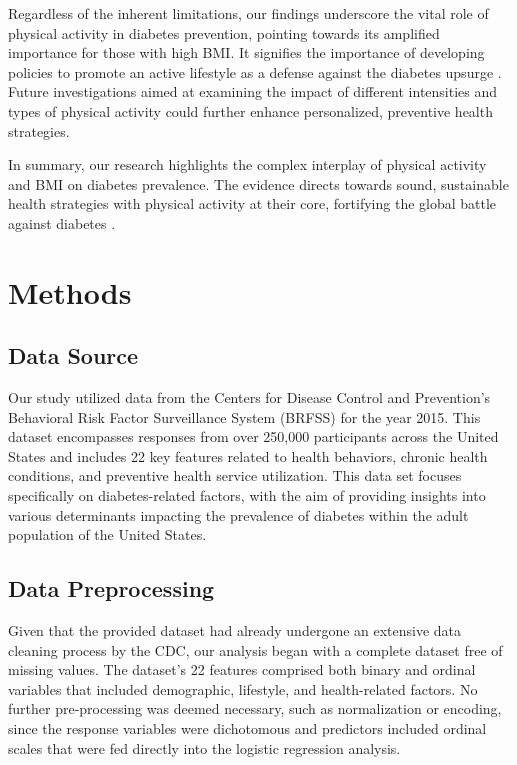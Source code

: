 \documentclass[11pt]{article}
\begin{document}
Regardless of the inherent limitations, our findings underscore the vital role of physical activity in diabetes prevention, pointing towards its amplified importance for those with high BMI. It signifies the importance of developing policies to promote an active lifestyle as a defense against the diabetes upsurge \cite{Aldossari2018PrevalenceOP, Casagrande2013ThePO}. Future investigations aimed at examining the impact of different intensities and types of physical activity could further enhance personalized, preventive health strategies.

In summary, our research highlights the complex interplay of physical activity and BMI on diabetes prevalence. The evidence directs towards sound, sustainable health strategies with physical activity at their core, fortifying the global battle against diabetes \cite{Akter2014PrevalenceOD, Peer2012RisingDP}.

\section*{Methods}

\subsection*{Data Source}
Our study utilized data from the Centers for Disease Control and Prevention's Behavioral Risk Factor Surveillance System (BRFSS) for the year 2015. This dataset encompasses responses from over 250,000 participants across the United States and includes 22 key features related to health behaviors, chronic health conditions, and preventive health service utilization. This data set focuses specifically on diabetes-related factors, with the aim of providing insights into various determinants impacting the prevalence of diabetes within the adult population of the United States.

\subsection*{Data Preprocessing}
Given that the provided dataset had already undergone an extensive data cleaning process by the CDC, our analysis began with a complete dataset free of missing values. The dataset’s 22 features comprised both binary and ordinal variables that included demographic, lifestyle, and health-related factors. No further pre-processing was deemed necessary, such as normalization or encoding, since the response variables were dichotomous and predictors included ordinal scales that were fed directly into the logistic regression analysis.
\end{document}
